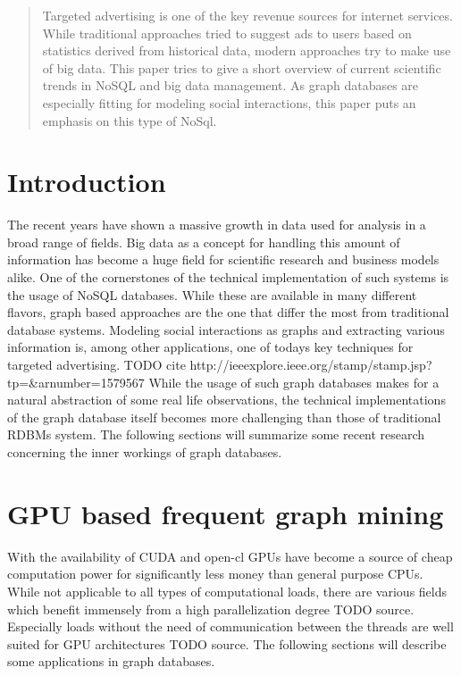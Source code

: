 \documentclass{sig-alternate}
\begin{document}
\maketitle
\begin{abstract}
Targeted advertising is one of the key revenue sources 
for internet services. While traditional approaches tried
to suggest ads to users based on statistics derived from historical data,
modern approaches try to make use of big data.
This paper tries to give a short overview of current scientific trends 
in NoSQL and big data management. As graph databases are especially fitting for 
modeling social interactions, this paper puts an emphasis on this type of NoSql.
\end{abstract}


\section{Introduction}
The recent years have shown a massive growth in data 
used for analysis in a broad range of fields.
Big data as a concept for handling this amount of information
has become a huge field for scientific research and 
business models alike. One of the cornerstones of the technical
implementation of such systems is the usage of NoSQL databases.
While these are available in many different flavors, graph based approaches
are the one that differ the most from traditional database systems.
Modeling social interactions as graphs and extracting various information
is, among other applications, one of todays key techniques for targeted advertising. TODO cite http://ieeexplore.ieee.org/stamp/stamp.jsp?tp=&arnumber=1579567
While the usage of such graph databases makes for a natural abstraction
of some real life observations, the technical implementations
of the graph database itself becomes more challenging than those of
traditional RDBMs system.
The following sections will summarize some recent research concerning 
the inner workings of graph databases.

\section{GPU based frequent graph mining}
With the availability of CUDA and open-cl GPUs have become
a source of cheap computation power for significantly less money 
than general purpose CPUs. While not applicable to all types
of computational loads, there are various fields which benefit 
immensely from a high parallelization degree TODO source.
Especially loads without the need of communication between the 
threads are well suited for GPU architectures TODO source.
The following sections will describe some applications in graph databases.
\end{document}
